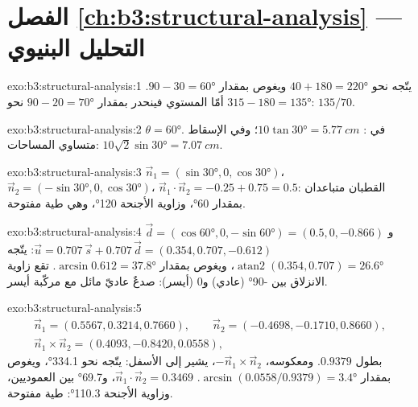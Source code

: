 \section*{الفصل \ref{ch:b3:structural-analysis} --- التحليل البنيوي}

\begin{solution}{exo:b3:structural-analysis:1}
يتّجه  نحو $40 + 180 = \ang{220}$ ويغوص بمقدار $90 - 30 = \ang{60}$. أمّا
المستوي فينحدر بمقدار $90 - 20 = \ang{70}$ نحو $315 - 180 = \ang{135}$: $135/70$.
\end{solution}

\begin{solution}{exo:b3:structural-analysis:2}
$\theta = \ang{60}$. في : $10\tan\ang{30} = \qty{5.77}{cm}$؛
وفي الإسقاط متساوي المساحات: $10\sqrt2\sin\ang{30} = \qty{7.07}{cm}$.
\end{solution}

\begin{solution}{exo:b3:structural-analysis:3}
$\vec n_1 = (\sin\ang{30}, 0, \cos\ang{30})$، $\vec n_2 = (-\sin\ang{30}, 0,
\cos\ang{30})$، $\vec n_1\cdot\vec n_2 = -0.25 + 0.75 = 0.5$: القطبان متباعدان بمقدار
\ang{60}، وزاوية الأجنحة \ang{120}، وهي طية مفتوحة.
\end{solution}

\begin{solution}{exo:b3:structural-analysis:4}
$\vec d = (\cos\ang{60}, 0, -\sin\ang{60}) = (0.5, 0, -0.866)$ و$\vec u =
0.707\,\vec s + 0.707\,\vec d = (0.354, 0.707, -0.612)$: يتّجه
$\operatorname{atan2}(0.354, 0.707) = \ang{26.6}$، ويغوص بمقدار $\arcsin0.612 =
\ang{37.8}$. تقع زاوية الانزلاق بين \ang{-90} (عادي) و0 (أيسر): صدعٌ
عاديّ مائل مع مركّبة أيسر.
\end{solution}

\begin{solution}{exo:b3:structural-analysis:5}
\begin{gather*}
  \vec n_1 = (0.5567, 0.3214, 0.7660),\qquad \vec n_2 = (-0.4698, -0.1710, 0.8660),\\
  \vec n_1\times\vec n_2 = (0.4093, -0.8420, 0.0558),
\end{gather*}
بطول $0.9379$. ومعكوسه، $-\vec n_1\times\vec n_2$، يشير إلى الأسفل:
يتّجه نحو \ang{334.1}، ويغوص بمقدار $\arcsin(0.0558/0.9379) = \ang{3.4}$. $\vec n_1\cdot\vec
n_2 = 0.3469$، و\ang{69.7} بين العموديين، وزاوية الأجنحة \ang{110.3}:
طية مفتوحة.
\end{solution}


